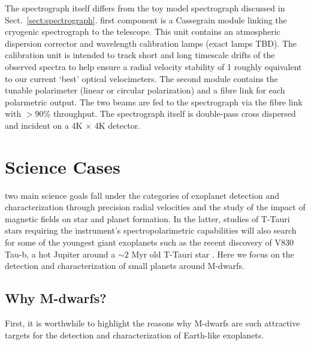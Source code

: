 The spectrograph itself differs from the toy model spectrograph discussed in 
Sect.~\ref{sect:spectrograph}.  first component is a Cassegrain 
module linking the cryogenic spectrograph to the telescope. This unit contains 
an atmospheric dispersion corrector and wavelength calibration lamps (exact lamps 
TBD). The 
calibration unit is intended to track short and long timescale drifts of the 
observed 
spectra to help ensure a radial velocity stability of 1 \mps{;}  
roughly equivalent to our current `best' optical velocimeters. The second module 
contains the tunable polarimeter (linear or circular polarization) and a fibre 
link for each polarmetric output. The two beams are fed to the spectrograph via the 
fibre link with $>90$\% throughput. The spectrograph itself is double-pass cross 
dispersed and incident on a 4K $\times$ 4K detector. 

\section{Science Cases} \label{sect:spirouscience}
 two main science goals fall under the categories of exoplanet detection 
and characterization through precision radial velocities and the study of the impact of 
magnetic fields on star and planet formation. In the latter, studies of T-Tauri stars 
requiring the instrument's spectropolarimetric capabilities will also search for 
some of the youngest giant 
exoplanets such as the recent discovery of V830 Tau-b, a hot Jupiter 
around a $\sim 2$ Myr old T-Tauri star \parencite{donati16}. Here we focus 
on the detection and characterization of small planets around M-dwarfs.

\subsection{Why M-dwarfs?} \label{sect:mdwarfs}
First, it is worthwhile to highlight the reasons why M-dwarfs 
are such attractive targets for the detection and characterization of Earth-like
exoplanets. 

